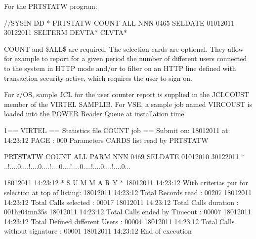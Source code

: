 \documentclass[letterpaper,10pt,english]{sphinxmanual}
\begin{document}
\sphinxAtStartPar
For the PRTSTATW program:

\begin{sphinxVerbatim}[commandchars=\\\{\}]
//SYSIN DD *
PRTSTATW COUNT \PYGZdl{}ALL\PYGZdl{} NNN 0465
SELDATE 01012011 30122011
SELTERM DEVTA* CLVTA*
\end{sphinxVerbatim}

\sphinxAtStartPar
COUNT and \$ALL\$ are required. The selection cards are optional. They allow for example to report for a given period the number of different users connected to the system in HTTP mode and/or to filter on an HTTP line defined with transaction security active, which requires the user to sign on.

\sphinxAtStartPar
For z/OS, sample JCL for the user counter report is supplied in the JCLCOUST member of the VIRTEL SAMPLIB. For VSE, a sample job named VIRCOUST is loaded into the POWER Reader Queue at installation time.

\begin{sphinxVerbatim}[commandchars=\\\{\}]
1== VIRTEL == Statistics file COUNT job ==
Submit on: 18\PYGZhy{}01\PYGZhy{}2011 at: 14:23:12              PAGE : 000
Parameters CARDS list read by PRTSTATW

PRTSTATW COUNT                  \PYGZdl{}ALL\PYGZdl{}   PARM        NNN 0469
SELDATE 01012010 30122011
* ..!....0....!....0....!....0....!....0....!....0....!....0...

18\PYGZhy{}01\PYGZhy{}2011      14:23:12                * S U M M A R Y *
18\PYGZhy{}01\PYGZhy{}2011      14:23:12                With criterias put for selection at top of listing:
18\PYGZhy{}01\PYGZhy{}2011      14:23:12                Total Records read              : 00207
18\PYGZhy{}01\PYGZhy{}2011      14:23:12                Total Calls selected            : 00017
18\PYGZhy{}01\PYGZhy{}2011      14:23:12                Total Calls duration            : 001hr04mn35s
18\PYGZhy{}01\PYGZhy{}2011      14:23:12                Total Calls ended by \PYGZdq{}Timeout\PYGZdq{}  : 00007
18\PYGZhy{}01\PYGZhy{}2011      14:23:12                Total Defined different Users   : 00004
18\PYGZhy{}01\PYGZhy{}2011      14:23:12                Total Calls without signature   : 00001
18\PYGZhy{}01\PYGZhy{}2011      14:23:12                End of execution
\end{sphinxVerbatim}

\sphinxAtStartPar
{}
\end{document}
